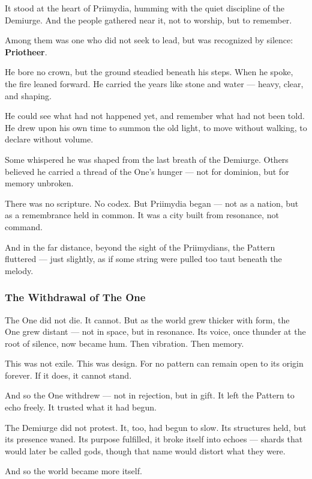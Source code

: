 \documentclass[12pt]{article}
\begin{document}
It stood at the heart of Priimydia, humming with the quiet discipline of the Demiurge.  
And the people gathered near it, not to worship, but to remember.

Among them was one who did not seek to lead, but was recognized by silence: \textbf{Priotheer}.

He bore no crown, but the ground steadied beneath his steps.  
When he spoke, the fire leaned forward.  
He carried the years like stone and water — heavy, clear, and shaping.

He could see what had not happened yet, and remember what had not been told.  
He drew upon his own time to summon the old light, to move without walking, to declare without volume.

Some whispered he was shaped from the last breath of the Demiurge.  
Others believed he carried a thread of the One’s hunger — not for dominion, but for memory unbroken.

There was no scripture. No codex.  
But Priimydia began — not as a nation, but as a remembrance held in common.  
It was a city built from resonance, not command.

And in the far distance, beyond the sight of the Priimydians, the Pattern fluttered —  
just slightly,  
as if some string were pulled too taut beneath the melody.

\dotfill

\subsubsection*{The Withdrawal of The One}

The One did not die.  
It cannot.  
But as the world grew thicker with form, the One grew distant — not in space, but in resonance.  
Its voice, once thunder at the root of silence, now became hum. Then vibration. Then memory.

This was not exile. This was design.  
For no pattern can remain open to its origin forever.  
If it does, it cannot stand.

And so the One withdrew — not in rejection, but in gift.  
It left the Pattern to echo freely.  
It trusted what it had begun.

The Demiurge did not protest.  
It, too, had begun to slow. Its structures held, but its presence waned.  
Its purpose fulfilled, it broke itself into echoes — shards that would later be called gods, though that name would distort what they were.

And so the world became more itself.
\end{document}
